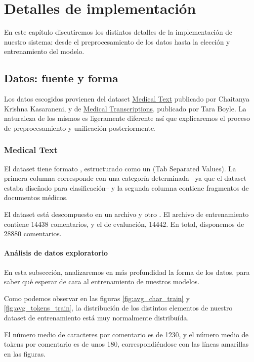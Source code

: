 \chapter{Detalles de implementación}

En este capítulo discutiremos los distintos detalles de la implementación de nuestro sistema: desde el preprocesamiento de los datos hasta la elección y entrenamiento del modelo.


\section{Datos: fuente y forma}
Los datos escogidos provienen del dataset \href{https://www.kaggle.com/chaitanyakck/medical-text}{Medical Text} publicado por Chaitanya Krishna Kasaraneni, y de \href{https://www.kaggle.com/tboyle10/medicaltranscriptions}{Medical Transcriptions}, publicado por Tara Boyle. La naturaleza de los mismos es ligeramente diferente así que explicaremos el proceso de preprocesamiento y unificación posteriormente.

\subsection{Medical Text}
El dataset tiene formato , estructurado como un  (Tab Separated Values). La primera columna corresponde con una categoría determinada --ya que el dataset estaba diseñado para clasificación-- y la segunda columna contiene fragmentos de documentos médicos.

El dataset está descompuesto en un archivo  y otro . El archivo de entrenamiento contiene 14438 comentarios, y el de evaluación, 14442. En total, disponemos de 28880 comentarios.

\subsubsection{Análisis de datos exploratorio}
En esta subsección, analizaremos en más profundidad la forma de los datos, para saber qué esperar de cara al entrenamiento de nuestros modelos.

Como podemos observar en las figuras \ref{fig:avg_char_train} y \ref{fig:avg_tokens_train}, la distribución de los distintos elementos de nuestro dataset de entrenamiento está muy normalmente distribuída.

El número medio de caracteres por comentario es de 1230, y el número medio de tokens por comentario es de unos 180, correspondiéndose con las líneas amarillas en las figuras.


